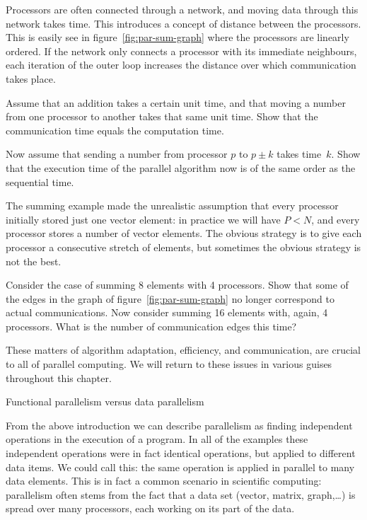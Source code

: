 Processors are often connected through a network, and moving data
through this network takes time. This introduces a concept of distance
between the processors. This is easily see in figure~\ref{fig:par-sum-graph}
where the
processors are linearly ordered. If the network only connects a
processor with its immediate neighbours,  each iteration of the
outer loop increases the distance over which communication takes
place.

\begin{exercise}
  \label{ex:summing0}
  Assume that an addition takes a certain unit time, and that moving a
  number from one processor to another takes that same unit time. Show
  that the communication time equals the computation time.

  Now assume that sending a number from processor $p$ to $p\pm k$
  takes time~$k$. Show that the execution time of the parallel
  algorithm now is of the same order as the sequential time.
\end{exercise}

The summing example made the unrealistic assumption that every
processor initially stored just one vector element: in practice we will
have $P<N$, and every processor stores a number of vector
elements. The obvious strategy is to give each processor a consecutive
stretch of elements, but sometimes the obvious strategy is not the
best.

\begin{exercise}
  Consider the case of summing 8 elements with 4 processors. Show that
  some of the edges in the graph of figure~\ref{fig:par-sum-graph} no
  longer correspond to actual communications. 
  Now consider summing 16 elements with, again, 4 processors. What is
  the number of communication edges this time?
\end{exercise}

These matters of algorithm adaptation, efficiency, and communication,
are crucial to all of parallel computing. We will return to these
issues in various guises throughout this chapter.

 {Functional parallelism versus data parallelism}

From the above introduction we can describe parallelism as finding
independent operations in the execution of a program. In all of the examples
these independent operations were in fact identical operations, but applied to
different data items. We could call this: the same
operation is applied in parallel to many data elements.
This is in fact a common scenario in scientific computing: parallelism
often stems from the fact that a data set (vector, matrix,
graph,\ldots) is spread over many processors, each working on its part
of the data. 

